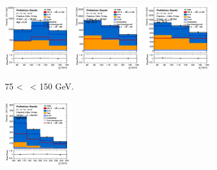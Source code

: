 \begin{figure}[h!]
    \centering
    \begin{subfigure}[b]{\textwidth}
        \centering
        \includegraphics[width=0.32\textwidth]{Images/VH/Own_fit/postfit_VHbb/Region_distpTV_BMax150_BMin75_DCRHigh_J2_TTypebb_T2_L2_Y6051_GlobalFit_conditionnal_mu1.png}
        \includegraphics[width=0.32\textwidth]{Images/VH/Own_fit/postfit_VHbb/Region_distpTV_BMax150_BMin75_DCRHigh_J3_TTypebb_T2_L2_Y6051_GlobalFit_conditionnal_mu1.png}
        \includegraphics[width=0.32\textwidth]{Images/VH/Own_fit/postfit_VHbb/Region_distpTV_BMax150_BMin75_DCRHigh_J4_TTypebb_incJet1_T2_L2_Y6051_GlobalFit_conditionnal_mu1.png}
        \caption{75 < \ptv\ < 150 GeV.}
        \label{fig:plots_VHbb_2L_75_CRL}
    \end{subfigure}
    \begin{subfigure}[b]{\textwidth}
        \centering
        \includegraphics[width=0.32\textwidth]{Images/VH/Own_fit/postfit_VHbb/Region_distpTV_BMax250_BMin150_DCRHigh_J2_TTypebb_T2_L2_Y6051_GlobalFit_conditionnal_mu1.png}

\end{subfigure}
\end{figure}
